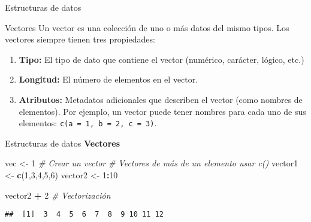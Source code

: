 \documentclass[
  ignorenonframetext,
]{beamer}
\newenvironment{Shaded}{\begin{snugshade}}{\end{snugshade}}
\newcommand{\CommentTok}[1]{\textcolor[rgb]{0.56,0.35,0.01}{\textit{#1}}}
\newcommand{\DecValTok}[1]{\textcolor[rgb]{0.00,0.00,0.81}{#1}}
\newcommand{\FunctionTok}[1]{\textcolor[rgb]{0.13,0.29,0.53}{\textbf{#1}}}
\newcommand{\NormalTok}[1]{#1}
\newcommand{\OtherTok}[1]{\textcolor[rgb]{0.56,0.35,0.01}{#1}}
\newcommand{\SpecialCharTok}[1]{\textcolor[rgb]{0.81,0.36,0.00}{\textbf{#1}}}
\begin{document}
\begin{frame}[fragile]{Estructuras de datos}
\label{estructuras-de-datos}
\begin{block}{Vectores}
\label{vectores}
Un vector es una colección de uno o más datos del mismo tipos. Los
vectores siempre tienen tres propiedades:

\begin{enumerate}
\item
  \textbf{Tipo:} El tipo de dato que contiene el vector (numérico,
  carácter, lógico, etc.)
\item
  \textbf{Longitud:} El número de elementos en el vector.
\item
  \textbf{Atributos:} Metadatos adicionales que describen el vector
  (como nombres de elementos). Por ejemplo, un vector puede tener
  nombres para cada uno de sus elementos:
  \texttt{c(a\ =\ 1,\ b\ =\ 2,\ c\ =\ 3)}.
\end{enumerate}
\end{block}
\end{frame}

\begin{frame}[fragile]{Estructuras de datos}
\label{estructuras-de-datos-1}
\textbf{Vectores}

\begin{Shaded}
\begin{Highlighting}[]
\NormalTok{vec }\OtherTok{\textless{}{-}} \DecValTok{1} \CommentTok{\# Crear un vector}
\CommentTok{\# Vectores de más de un elemento usar c()}
\NormalTok{vector1 }\OtherTok{\textless{}{-}} \FunctionTok{c}\NormalTok{(}\DecValTok{1}\NormalTok{,}\DecValTok{3}\NormalTok{,}\DecValTok{4}\NormalTok{,}\DecValTok{5}\NormalTok{,}\DecValTok{6}\NormalTok{)}
\NormalTok{vector2 }\OtherTok{\textless{}{-}} \DecValTok{1}\SpecialCharTok{:}\DecValTok{10}

\NormalTok{vector2 }\SpecialCharTok{+} \DecValTok{2} \CommentTok{\# Vectorización}
\end{Highlighting}
\end{Shaded}

\begin{verbatim}
##  [1]  3  4  5  6  7  8  9 10 11 12
\end{verbatim}
\end{frame}
\end{document}
